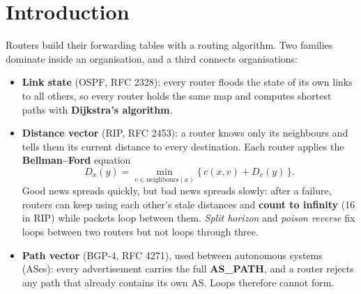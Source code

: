 \documentclass[11pt,a4paper]{article}
\begin{document}
\section{Introduction}
\noindent Routers build their forwarding tables with a routing algorithm. Two families dominate inside an organisation, and a third connects organisations:
\begin{itemize}[leftmargin=2em]
    \item \textbf{Link state} (OSPF, RFC 2328): every router floods the state of its own links to all others, so every router holds the same map and computes shortest paths with \textbf{Dijkstra's algorithm}.
    \item \textbf{Distance vector} (RIP, RFC 2453): a router knows only its neighbours and tells them its current distance to every destination. Each router applies the \textbf{Bellman--Ford} equation
    \[ D_x(y) = \min_{v \in \text{neighbours}(x)} \{\, c(x,v) + D_v(y) \,\}. \]
    Good news spreads quickly, but bad news spreads slowly: after a failure, routers can keep using each other's stale distances and \textbf{count to infinity} (16 in RIP) while packets loop between them. \emph{Split horizon} and \emph{poison reverse} fix loops between two routers but not loops through three.
    \item \textbf{Path vector} (BGP-4, RFC 4271), used between autonomous systems (ASes): every advertisement carries the full \textbf{AS\_PATH}, and a router rejects any path that already contains its own AS. Loops therefore cannot form.
\end{itemize}
\end{document}
